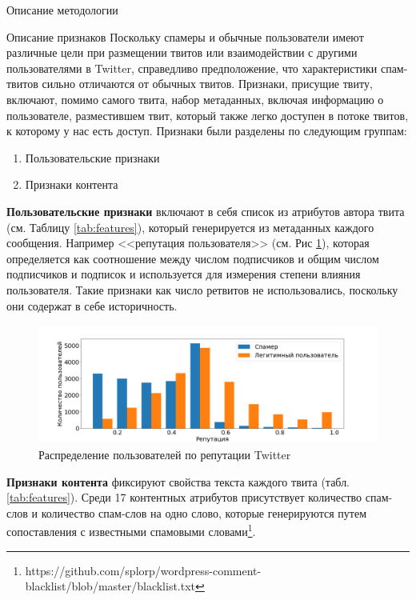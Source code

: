 \begin{section}{Описание методологии}
  \begin{subsection}{Описание признаков}
    Поскольку спамеры и обычные пользователи имеют различные цели при размещении твитов или взаимодействии с другими пользователями в Twitter, справедливо предположение, что характеристики спам-твитов сильно отличаются от обычных твитов.
    Признаки, присущие твиту, включают, помимо самого твита, набор метаданных, включая информацию о пользователе, разместившем твит, который также легко доступен в потоке твитов, к которому у нас есть доступ.
    Признаки были разделены по следующим группам:
    \begin{enumerate}
      \item Пользовательские признаки
      \item Признаки контента
    \end{enumerate}

    \textbf{Пользовательские признаки} включают в себя список из атрибутов автора твита (см. Таблицу \ref{tab:features}), который генерируется из метаданных каждого сообщения. Например <<репутация пользователя>> \cite{Wang} (см. Рис \ref{pic:reputation}), которая определяется как соотношение между числом подписчиков и общим числом подписчиков и подписок и используется для измерения степени влияния пользователя. Такие признаки как число ретвитов не использовались, поскольку они содержат в себе историчность.

    \begin{figure}[ht!]
    \centering
    \includegraphics[width=1.0\textwidth]{pics/reputation}
    \caption{Распределение пользователей по репутации Twitter}
    \label{pic:reputation}
    \end{figure}

    \textbf{Признаки контента} фиксируют свойства текста каждого твита (табл. \ref{tab:features}).
     Среди 17 контентных атрибутов присутствует количество спам-слов и количество спам-слов на одно слово, которые генерируются путем сопоставления с известными спамовыми словами\footnote{https://github.com/splorp/wordpress-comment-blacklist/blob/master/blacklist.txt}.



\end{subsection}
\end{section}
